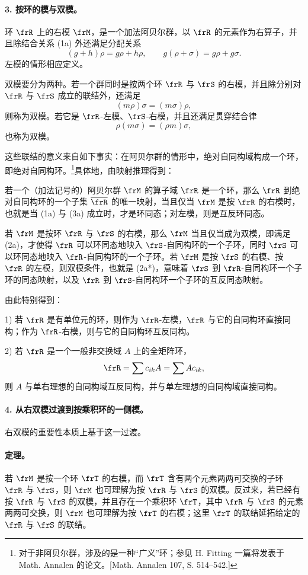 \paragraph{3. 按环的模与双模。}
环 \(\frR\) 上的右模 \(\frM\)，是一个加法阿贝尔群，以 \(\frR\) 的元素作为右算子，并且除结合关系 (1a) 外还满足分配关系
\[
        (g+h)\rho=g\rho+h\rho,\qquad
        g(\rho+\sigma)=g\rho+g\sigma.                                  \tag{3a}
\]
左模的情形相应定义。

双模要分为两种。若一个群同时是按两个环 \(\frR\) 与 \(\frS\) 的右模，并且除分别对 \(\frR\) 与 \(\frS\) 成立的联结外，还满足
\[
        (m\rho)\sigma=(m\sigma)\rho,
\]
则称为双模。若它是 \(\frR\)-左模、\(\frS\)-右模，并且还满足贯穿结合律
\[
        \rho(m\sigma)=(\rho m)\sigma,
\]
也称为双模。

这些联结的意义来自如下事实：在阿贝尔群的情形中，绝对自同构域构成一个环，即绝对自同构环。\footnote{对于非阿贝尔群，涉及的是一种“广义”环；参见 H. Fitting 一篇将发表于 Math. Annalen 的论文。[Math. Annalen 107, S. 514--542.] }具体地，由映射推理得到：

若一个（加法记号的）阿贝尔群 \(\frM\) 的算子域 \(\frR\) 是一个环，那么 \(\frR\) 到绝对自同构环的一个子集 \(\overline{\frR}\) 的唯一映射，当且仅当 \(\frM\) 是按 \(\frR\) 的右模时，也就是当 (1a) 与 (3a) 成立时，才是环同态；对左模，则是互反环同态。

若 \(\frM\) 是按环 \(\frR\) 与 \(\frS\) 的右模，那么 \(\frM\) 当且仅当成为双模，即满足 (2a)，才使得 \(\frR\) 可以环同态地映入 \(\frS\)-自同构环的一个子环，同时 \(\frS\) 可以环同态地映入 \(\frR\)-自同构环的一个子环。若 \(\frM\) 是按 \(\frS\) 的右模、按 \(\frR\) 的左模，则双模条件，也就是 (2a*)，意味着 \(\frS\) 到 \(\frR\)-自同构环一个子环的同态映射，以及 \(\frR\) 到 \(\frS\)-自同构环一个子环的互反同态映射。

由此特别得到：

1) 若 \(\frR\) 是有单位元的环，则作为 \(\frR\)-左模，\(\frR\) 与它的自同构环直接同构；作为 \(\frR\)-右模，则与它的自同构环互反同构。

2) 若 \(\frR\) 是一个一般非交换域 \(A\) 上的全矩阵环，
\[
        \frR=\sum c_{ik}A=\sum A c_{ik},
\]
则 \(A\) 与单右理想的自同构域互反同构，并与单左理想的自同构域直接同构。

\paragraph{4. 从右双模过渡到按乘积环的一侧模。}
右双模的重要性本质上基于这一过渡。

\paragraph{定理。}
若 \(\frM\) 是按一个环 \(\frT\) 的右模，而 \(\frT\) 含有两个元素两两可交换的子环 \(\frR\) 与 \(\frS\)，则 \(\frM\) 也可理解为按 \(\frR\) 与 \(\frS\) 的双模。反过来，若已经有按 \(\frR\) 与 \(\frS\) 的双模，并且存在一个乘积环 \(\frT\)，其中 \(\frR\) 与 \(\frS\) 的元素两两可交换，则 \(\frM\) 也可理解为按 \(\frT\) 的右模；这里 \(\frT\) 的联结延拓给定的 \(\frR\) 与 \(\frS\) 的联结。

